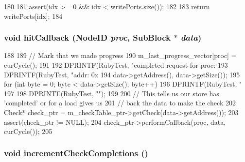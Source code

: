 \begin{DoxyCode}
180 {
181     assert(idx >= 0 && idx < writePorts.size());
182 
183     return writePorts[idx];
184 }
\end{DoxyCode}
\hypertarget{classRubyTester_a8b71a10b528265ae6a63c53c28360d60}{
\subsubsection[{hitCallback}]{\setlength{\rightskip}{0pt plus 5cm}void hitCallback ({\bf NodeID} {\em proc}, \/  {\bf SubBlock} $\ast$ {\em data})}}
\label{classRubyTester_a8b71a10b528265ae6a63c53c28360d60}



\begin{DoxyCode}
188 {
189     // Mark that we made progress
190     m_last_progress_vector[proc] = curCycle();
191 
192     DPRINTF(RubyTest, "completed request for proc: %
193     DPRINTF(RubyTest, "addr: 0x%
194             data->getAddress(), data->getSize());
195     for (int byte = 0; byte < data->getSize(); byte++) {
196         DPRINTF(RubyTest, "%
197     }
198     DPRINTF(RubyTest, "\n");
199 
200     // This tells us our store has 'completed' or for a load gives us
201     // back the data to make the check
202     Check* check_ptr = m_checkTable_ptr->getCheck(data->getAddress());
203     assert(check_ptr != NULL);
204     check_ptr->performCallback(proc, data, curCycle());
205 }
\end{DoxyCode}
\hypertarget{classRubyTester_a7bf3ac9b8e83cf7ec4fd1462ead30b3b}{
\subsubsection[{incrementCheckCompletions}]{\setlength{\rightskip}{0pt plus 5cm}void incrementCheckCompletions ()}}
\label{classRubyTester_a7bf3ac9b8e83cf7ec4fd1462ead30b3b}



